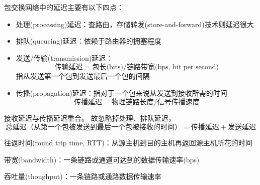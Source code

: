 包交换网络中的延迟主要有以下四点：
\begin{itemize}
	\item 处理(processing)延迟：查路由，存储转发(store-and-forward)技术则延迟很大
	\item 排队(queueing)延迟：依赖于路由器的拥塞程度
	\item 发送/传输(transmission)延迟：\[\text{传输延迟}=\text{包长(bits)}/\text{链路带宽(bps, bit per second)}\]
	指从发送第一个包到发送最后一个包的间隔
	\item 传播(propagation)延迟：指对于一个包来说从发送到接收所需的时间
	\[\text{传播延迟}=\text{物理链路长度}/\text{信号传播速度}\]
\end{itemize}

接收延迟与传播延迟重合。
故忽略掉处理、排队延迟，
\[\text{总延迟（从第一个包被发送到最后一个包被接收的时间）}=\text{传播延迟}+\text{发送延迟}\]

\myhline
\par 往返时间(round trip time, RTT)：从源主机到目的主机再返回源主机所花的时间
\par 带宽(bandwidth)：一条链路或通道可达到的数据传输速率(bps)
\par 吞吐量(thoughput)：一条链路或通路数据传输速率

